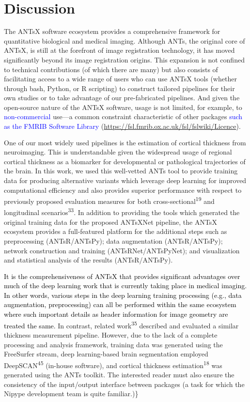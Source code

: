 \documentclass[12pt,]{article}
\begin{document}
\hypertarget{discussion}{%
\section*{Discussion}\label{discussion}}

The ANTsX software ecosystem provides a comprehensive framework for
quantitative biological and medical imaging. Although ANTs, the original
core of ANTsX, is still at the forefront of image registration
technology, it has moved significantly beyond its image registration
origins. This expansion is not confined to technical contributions (of
which there are many) but also consists of facilitating access to a wide
range of users who can use ANTsX tools (whether through bash, Python, or
R scripting) to construct tailored pipelines for their own studies or to
take advantage of our pre-fabricated pipelines. And given the
open-source nature of the ANTsX software, usage is not limited, for
example, to \textcolor{blue}{non-commercial} use---a common constraint
characteristic of other packages
\textcolor{blue}{such as the FMRIB Software Library}
(\url{https://fsl.fmrib.ox.ac.uk/fsl/fslwiki/Licence}).

One of our most widely used pipelines is the estimation of cortical
thickness from neuroimaging. This is understandable given the widespread
usage of regional cortical thickness as a biomarker for developmental or
pathological trajectories of the brain. In this work, we used this
well-vetted ANTs tool to provide training data for producing alternative
variants which leverage deep learning for improved computational
efficiency and also provides superior performance with respect to
previously proposed evaluation measures for both
cross-sectional\textsuperscript{19} and longitudinal
scenarios\textsuperscript{33}. In addition to providing the tools which
generated the original training data for the proposed ANTsXNet pipeline,
the ANTsX ecosystem provides a full-featured platform for the additional
steps such as preprocessing (ANTsR/ANTsPy); data augmentation
(ANTsR/ANTsPy); network construction and training (ANTsRNet/ANTsPyNet);
and visualization and statistical analysis of the results
(ANTsR/ANTsPy).

\textcolor{black}{It is the comprehensiveness of ANTsX that provides significant
advantages over much of the deep learning work that is currently taking place in
medical imaging. In other words, various steps in the deep learning training
processing (e.g., data augmentation, preprocessing) can all be performed within
the same ecosystem where such important details as header information for image
geometry are treated the same.} In contrast, related
work\textsuperscript{35} described and evaluated a similar thickness
measurement pipeline. However, due to the lack of a complete processing
and analysis framework, training data was generated using the FreeSurfer
stream, deep learning-based brain segmentation employed
DeepSCAN\textsuperscript{45} (in-house software), and cortical thickness
estimation\textsuperscript{18} was generated using the ANTs toolkit. The
interested reader must also ensure the consistency of the input/output
interface between packages (a task for which the Nipype development team
is quite familiar.)\}
\end{document}
